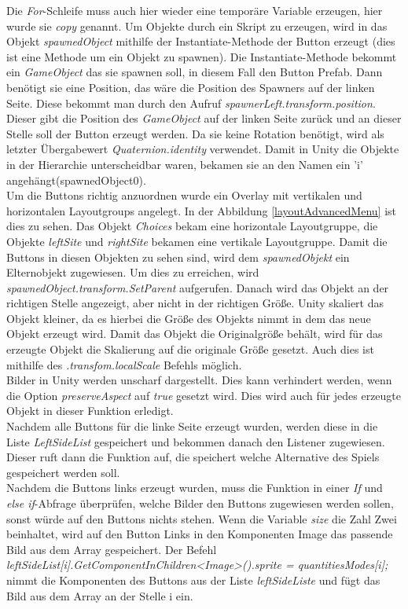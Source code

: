 Die \textit{For}-Schleife muss auch hier wieder eine temporäre Variable erzeugen, hier wurde sie \textit{copy} genannt. Um Objekte durch ein Skript zu erzeugen, wird in das Objekt \textit{spawnedObject} mithilfe der Instantiate-Methode der Button erzeugt (dies ist eine Methode um ein Objekt zu spawnen). Die Instantiate-Methode bekommt ein \textit{GameObject} das sie spawnen soll, in diesem Fall den Button Prefab. Dann benötigt sie eine Position, das wäre die Position des Spawners auf der linken Seite. Diese bekommt man durch den Aufruf \textit{spawnerLeft.transform.position}. Dieser gibt die Position des \textit{GameObject} auf der linken Seite zurück und an dieser Stelle soll der Button erzeugt werden. Da sie keine Rotation benötigt, wird als letzter Übergabewert \textit{Quaternion.identity} verwendet.
Damit in Unity die Objekte in der Hierarchie unterscheidbar waren, bekamen sie an den Namen ein 'i' angehängt(spawnedObject0).\\
Um die Buttons richtig anzuordnen wurde ein Overlay mit vertikalen und horizontalen Layoutgroups angelegt. In der Abbildung \ref{layoutAdvancedMenu} ist dies zu sehen. Das Objekt \textit{Choices} bekam eine horizontale Layoutgruppe, die Objekte \textit{leftSite} und \textit{rightSite} bekamen eine vertikale Layoutgruppe. 
Damit die Buttons in diesen Objekten zu sehen sind, wird dem \textit{spawnedObjekt} ein Elternobjekt zugewiesen. Um dies zu erreichen, wird \textit{spawnedObject.transform.SetParent} aufgerufen. Danach wird das Objekt an der richtigen Stelle angezeigt, aber nicht in der richtigen Größe. Unity skaliert das Objekt kleiner, da es hierbei die Größe des Objekts nimmt in dem das neue Objekt erzeugt wird. Damit das Objekt die Originalgröße behält, wird für das erzeugte Objekt die Skalierung auf die originale Größe gesetzt. Auch dies ist mithilfe des \textit{.transfom.localScale} Befehls möglich.\\
Bilder in Unity werden unscharf dargestellt. Dies kann verhindert werden, wenn die Option \textit{preserveAspect} auf \textit{true} gesetzt wird. Dies wird auch für jedes erzeugte Objekt in dieser Funktion erledigt.\\
Nachdem alle Buttons für die linke Seite erzeugt wurden, werden diese in die Liste \textit{LeftSideList} gespeichert und bekommen danach den Listener zugewiesen. Dieser ruft dann die Funktion auf, die speichert welche Alternative des Spiels gespeichert werden soll.\\
Nachdem die Buttons links erzeugt wurden, muss die Funktion in einer \textit{If} und \textit{else if}-Abfrage überprüfen, welche Bilder den Buttons zugewiesen werden sollen, sonst würde auf den Buttons nichts stehen. Wenn die Variable \textit{size} die Zahl Zwei beinhaltet, wird auf den Button Links in den Komponenten Image das passende Bild aus dem Array gespeichert. Der Befehl \textit{leftSideList[i].GetComponentInChildren<Image>().sprite = quantitiesModes[i];} nimmt die Komponenten des Buttons aus der Liste \textit{leftSideListe} und fügt das Bild aus dem Array an der Stelle i ein.\\
